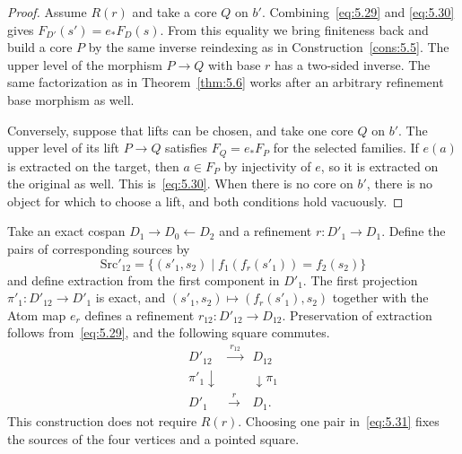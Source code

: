 \begin{proof}

Assume $R(r)$ and take a core $Q$ on $b'$. Combining~\eqref{eq:5.29} and \eqref{eq:5.30} gives
$F_{D'}(s')=e_*F_D(s)$. From this equality we bring finiteness back and build a core $P$ by
the same inverse reindexing as in Construction~\ref{cons:5.5}. The upper level of the
morphism $P\to Q$ with base $r$ has a two-sided inverse. The same factorization as in
Theorem~\ref{thm:5.6} works after an arbitrary refinement base morphism as well.

Conversely, suppose that lifts can be chosen, and take one core $Q$ on $b'$. The upper
level of its lift $P\to Q$ satisfies $F_Q=e_*F_P$ for the selected families. If $e(a)$ is
extracted on the target, then $a\in F_P$ by injectivity of $e$, so it is extracted on the
original as well. This is~\eqref{eq:5.30}. When there is no core on $b'$, there is no
object for which to choose a lift, and both conditions hold vacuously.

\end{proof}

\begin{construction}\label{cons:5.26}

Take an exact cospan $D_1\to D_0\leftarrow D_2$ and a refinement $r:D'_1\to D_1$. Define
the pairs of corresponding sources by
\begin{equation*}
\mathrm{Src}'_{12}
=\{(s'_1,s_2)\mid f_1(f_r(s'_1))=f_2(s_2)\}
\tag{5.31}\label{eq:5.31}
\end{equation*}
and define extraction from the first component in $D'_1$. The first projection
$\pi'_1:D'_{12}\to D'_1$ is exact, and $(s'_1,s_2)\mapsto(f_r(s'_1),s_2)$ together with the
Atom map $e_r$ defines a refinement $r_{12}:D'_{12}\to D_{12}$. Preservation of extraction
follows from~\eqref{eq:5.29}, and the following square commutes.
\begin{equation*}
\begin{array}{ccc}
D'_{12}&\xrightarrow{\ r_{12}\ }&D_{12}\\
{\scriptstyle\pi'_1}\downarrow&&\downarrow{\scriptstyle\pi_1}\\
D'_1&\xrightarrow{\ r\ }&D_1.
\end{array}
\tag{5.32}\label{eq:5.32}
\end{equation*}
This construction does not require $R(r)$. Choosing one pair in~\eqref{eq:5.31} fixes the
sources of the four vertices and a pointed square.

\end{construction}

